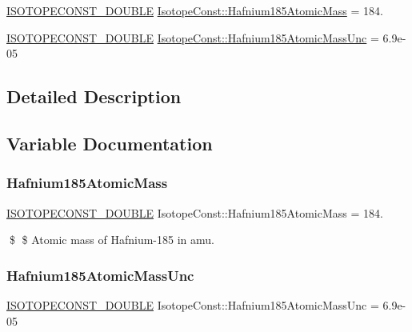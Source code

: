 \begin{DoxyCompactItemize}
\item 
\mbox{\hyperlink{group___isotope_const-_macros_ga8f45a7272ce02c0b4c65c44636ed719a}{I\+S\+O\+T\+O\+P\+E\+C\+O\+N\+S\+T\+\_\+\+D\+O\+U\+B\+LE}} \mbox{\hyperlink{group___isotope_const-_hafnium-_hf185_gadef593400e5dcfc0c457aa9481adca7e}{Isotope\+Const\+::\+Hafnium185\+Atomic\+Mass}} = 184.
\item 
\mbox{\hyperlink{group___isotope_const-_macros_ga8f45a7272ce02c0b4c65c44636ed719a}{I\+S\+O\+T\+O\+P\+E\+C\+O\+N\+S\+T\+\_\+\+D\+O\+U\+B\+LE}} \mbox{\hyperlink{group___isotope_const-_hafnium-_hf185_ga159e14c5303cda741024623807d58da6}{Isotope\+Const\+::\+Hafnium185\+Atomic\+Mass\+Unc}} = 6.\+9e-\/05
\end{DoxyCompactItemize}


\subsection{Detailed Description}


\subsection{Variable Documentation}
\mbox{\label{group___isotope_const-_hafnium-_hf185_gadef593400e5dcfc0c457aa9481adca7e}} 
\subsubsection{\texorpdfstring{Hafnium185\+Atomic\+Mass}{Hafnium185AtomicMass}}
{\footnotesize\ttfamily \mbox{\hyperlink{group___isotope_const-_macros_ga8f45a7272ce02c0b4c65c44636ed719a}{I\+S\+O\+T\+O\+P\+E\+C\+O\+N\+S\+T\+\_\+\+D\+O\+U\+B\+LE}} Isotope\+Const\+::\+Hafnium185\+Atomic\+Mass = 184.}

\$ \$ Atomic mass of Hafnium-\/185 in amu. \mbox{\label{group___isotope_const-_hafnium-_hf185_ga159e14c5303cda741024623807d58da6}} 
\subsubsection{\texorpdfstring{Hafnium185\+Atomic\+Mass\+Unc}{Hafnium185AtomicMassUnc}}
{\footnotesize\ttfamily \mbox{\hyperlink{group___isotope_const-_macros_ga8f45a7272ce02c0b4c65c44636ed719a}{I\+S\+O\+T\+O\+P\+E\+C\+O\+N\+S\+T\+\_\+\+D\+O\+U\+B\+LE}} Isotope\+Const\+::\+Hafnium185\+Atomic\+Mass\+Unc = 6.\+9e-\/05}


